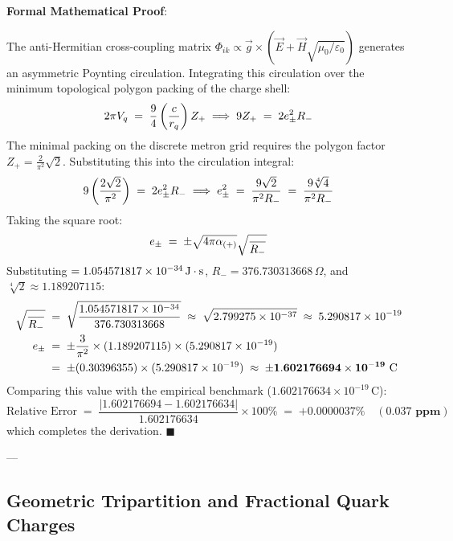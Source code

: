 \documentclass[
    12pt,
    a4paper,
    headings=normal,
    twoside=false,
    open=any,
    parskip=half
]{scrbook}
\let\hbar\relax
\newenvironment{myproof}[1][]{%
  \par\vspace{6pt}\noindent\textbf{\sffamily\color{maincolor}Formal Mathematical Proof\ifstrempty{#1}{}{ (#1)}}:\par\nopagebreak
}{%
  \penalty50\hfill\ensuremath{\blacksquare}\par\vspace{6pt}
}
\begin{document}
\begin{myproof}
The anti-Hermitian cross-coupling matrix $\Phi_{ik} \propto \vec{g} \times (\vec{E} + \vec{H}\sqrt{\mu_0/\varepsilon_0})$ generates an asymmetric Poynting circulation. Integrating this circulation over the minimum topological polygon packing of the charge shell:
\begin{equation*}
2\pi V_q \;=\; \frac{9}{4} \left( \frac{c\hbar}{r_q} \right) Z_+ \implies 9\hbar Z_+ \;=\; 2 e_\pm^2 R_-
\end{equation*}
The minimal packing on the discrete metron grid requires the polygon factor $Z_+ = \frac{2}{\pi^2} \sqrt{2}$. Substituting this into the circulation integral:
\begin{equation*}
9\hbar \left( \frac{2\sqrt{2}}{\pi^2} \right) \;=\; 2 e_\pm^2 R_- \implies e_\pm^2 \;=\; \frac{9\hbar \sqrt{2}}{\pi^2 R_-} \;=\; \frac{9\hbar \sqrt[4]{4}}{\pi^2 R_-}
\end{equation*}
Taking the square root:
\begin{equation*}
e_\pm \;=\; \pm \sqrt{4\pi \alpha_{(+)}} \sqrt{\frac{\hbar}{R_-}}
\end{equation*}
Substituting $\hbar = 1.054571817 \times 10^{-34}\,\text{J}\cdot\text{s}$, $R_- = 376.730313668\,\Omega$, and $\sqrt[4]{2} \approx 1.189207115$:
\begin{align*}
\sqrt{\frac{\hbar}{R_-}} &\;=\; \sqrt{\frac{1.054571817 \times 10^{-34}}{376.730313668}} \;\approx\; \sqrt{2.799275 \times 10^{-37}} \;\approx\; 5.290817 \times 10^{-19} \\
e_\pm &\;=\; \pm \frac{3}{\pi^2} \times (1.189207115) \times (5.290817 \times 10^{-19}) \\
&\;=\; \pm (0.30396355) \times (5.290817 \times 10^{-19}) \;\approx\; \pm \mathbf{1.602176694 \times 10^{-19} \text{ C}}
\end{align*}
Comparing this value with the empirical benchmark ($1.602176634 \times 10^{-19}\,\text{C}$):
\begin{equation*}
\text{Relative Error} \;=\; \frac{|1.602176694 - 1.602176634|}{1.602176634} \times 100\% \;=\; \mathbf{+0.0000037 \%} \quad (\mathbf{0.037 \text{ ppm}})
\end{equation*}
which completes the derivation.
\end{myproof}

---

\subsection{Geometric Tripartition and Fractional Quark Charges}
\end{document}
